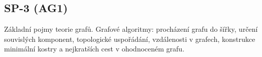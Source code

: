 \subsection{SP-3 (AG1)}
Základní pojmy teorie grafů. Grafové algoritmy: procházení grafu do šířky, určení souvislých komponent, topologické uspořádání, vzdálenosti v grafech, konstrukce minimální kostry a nejkratších cest v ohodnoceném grafu.